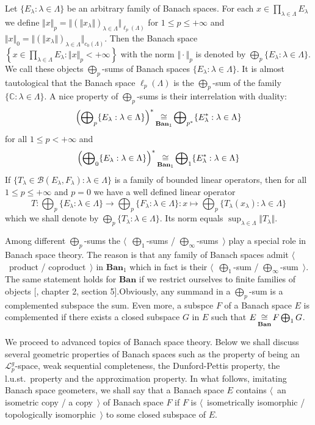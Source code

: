 Let $ \{E_\lambda:\lambda\in\Lambda \}$ be an arbitrary family of Banach spaces.
For each $x\in \prod_{\lambda\in\Lambda} E_\lambda$ we define 
$\Vert x\Vert_p
=\Vert{
  (\Vert x_\lambda\Vert)}_{\lambda\in\Lambda}
\Vert_{\ell_p(\Lambda)}$
for $1\leq p\leq +\infty$ and 
$\Vert x\Vert_0
=\Vert
  {(\Vert x_\lambda\Vert)}_{\lambda\in\Lambda}
\Vert_{c_0(\Lambda)}$. 
Then the Banach space
$\left \{
  x\in \prod_{\lambda\in\Lambda} E_\lambda
  :\Vert x\Vert_p<+\infty
\right \}$ 
with the norm $\Vert\cdot\Vert_p$ is denoted by $\bigoplus_p
\{E_\lambda:\lambda\in\Lambda \}$. We call these objects $\bigoplus_p$-sums of
Banach spaces $ \{E_\lambda:\lambda\in\Lambda \}$. It is almost tautological
that the Banach space $\ell_p(\Lambda)$ is the $\bigoplus_p$-sum of the family $
\{\mathbb{C}:\lambda\in\Lambda \}$. A nice property of $\bigoplus_p$-sums is
their interrelation with duality:
$$
{\left(\bigoplus\nolimits_p \{E_\lambda:\lambda\in\Lambda \}\right)}^*
\mathop{\mathbin{\cong}}\limits_{\mathbf{Ban}_1}
\bigoplus\nolimits_{p^*} \{E_\lambda^*:\lambda\in\Lambda \}
$$
for all $1\leq p<+\infty$ and 
$$
{\left(\bigoplus\nolimits_0 \{E_\lambda:\lambda\in\Lambda \}\right)}^*
\mathop{\mathbin{\cong}}\limits_{\mathbf{Ban}_1}
\bigoplus\nolimits_1 \{E_\lambda^*:\lambda\in\Lambda \}
$$
If $ \{T_\lambda\in\mathcal{B}(E_\lambda, F_\lambda):\lambda\in\Lambda \}$ is a
family of bounded linear operators, then for all $1\leq p\leq+\infty$ and $p=0$
we have a well defined linear operator
$$
T:\bigoplus\nolimits_p \{E_\lambda:\lambda\in\Lambda \}
  \to 
\bigoplus\nolimits_p \{ F_\lambda:\lambda\in\Lambda \}
:x\mapsto \bigoplus\nolimits_p \{ T_\lambda(x_\lambda):\lambda\in\Lambda \}
$$
which we shall denote by $\bigoplus_p \{T_\lambda:\lambda\in\Lambda \}$. Its
norm equals $\sup_{\lambda\in\Lambda}\Vert T_\lambda\Vert$.

Among different $\bigoplus_p$-sums the $\langle$~$\bigoplus_1$-sums /
$\bigoplus_\infty$-sums~$\rangle$ play a special role in Banach space theory.
The reason is that any family of Banach spaces admit $\langle$~product /
coproduct~$\rangle$ in $\mathbf{Ban}_1$ which in fact is their
$\langle$~$\bigoplus_1$-sum / $\bigoplus_\infty$-sum~$\rangle$. The same
statement holds for $\mathbf{Ban}$ if we restrict ourselves to finite families
of objects [\cite{HelLectAndExOnFuncAn}, chapter 2, section 5].Obviously, any 
summand in a $\bigoplus_p$-sum is a complemented subspace the sum. Even more, a
subspce $F$ of a Banach space $E$ is complemented if there exists a closed
subspace $G$ in $E$ such that $E\mathop{\mathbin{\cong}}\limits_{\mathbf{Ban}}F\bigoplus_1 G$.

We proceed to advanced topics of Banach space theory. Below we shall discuss
several geometric properties of Banach spaces such as the property of being an
$\mathscr{L}_p^g$-space, weak sequential completeness, the Dunford-Pettis
property, the l.u.st.\ property and the approximation property. In what follows,
imitating Banach space geometers, we shall say that a Banach space $E$ contains
$\langle$~an isometric copy / a copy~$\rangle$ of Banach space $F$ if $F$ is
$\langle$~isometrically isomorphic / topologically isomorphic~$\rangle$ to some
closed subspace of $E$. 

